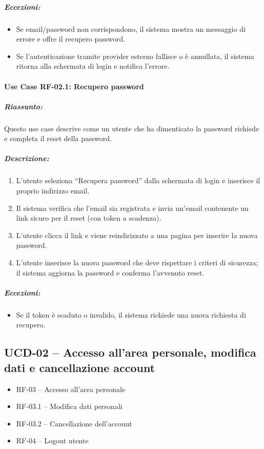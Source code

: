 \subparagraph*{Eccezioni:}
\begin{itemize}
    \item Se email/password non corrispondono, il sistema mostra un messaggio di errore e offre il recupero password.
    \item Se l’autenticazione tramite provider esterno fallisce o è annullata, il sistema ritorna alla schermata di login e notifica l’errore.
\end{itemize}

\paragraph*{Use Case RF-02.1: Recupero password}
\subparagraph*{Riassunto:}
Questo use case descrive come un utente che ha dimenticato la password richiede e completa il reset della password.

\subparagraph*{Descrizione:}
\begin{enumerate}
    \item L’utente seleziona ``Recupera password'' dalla schermata di login e inserisce il proprio indirizzo email.
    \item Il sistema verifica che l’email sia registrata e invia un’email contenente un link sicuro per il reset (con token a scadenza).
    \item L’utente clicca il link e viene reindirizzato a una pagina per inserire la nuova password.
    \item L’utente inserisce la nuova password che deve rispettare i criteri di sicurezza; il sistema aggiorna la password e conferma l’avvenuto reset.
\end{enumerate}

\subparagraph*{Eccezioni:}
\begin{itemize}
    \item Se il token è scaduto o invalido, il sistema richiede una nuova richiesta di recupero.
\end{itemize}

\subsection*{UCD-02 – Accesso all'area personale, modifica dati e cancellazione account}

\begin{itemize}
    \item RF-03 – Accesso all'area personale
    \item RF-03.1 – Modifica dati personali
    \item RF-03.2 – Cancellazione dell'account
    \item RF-04 – Logout utente
\end{itemize}

